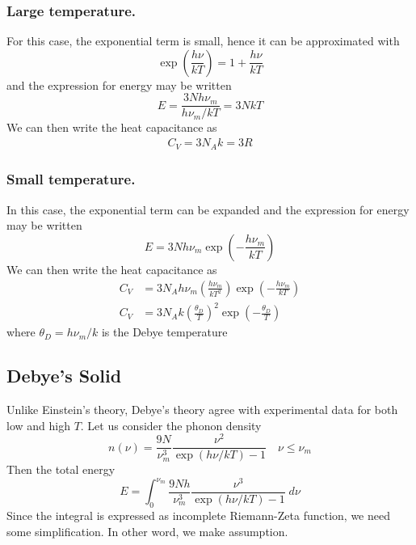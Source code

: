 \documentclass[../../../Main.tex]{subfiles}
\begin{document}
\subsubsection*{Large temperature.} For this case, the exponential term is small, hence it can be approximated with
\begin{equation*}
    \exp\left(\frac{h\nu}{kT}\right)=1+\frac{h\nu}{kT}
\end{equation*}
and the expression for energy may be written
\begin{equation*}
    E=\frac{3Nh\nu_m}{h\nu_m/kT}=3NkT
\end{equation*}
We can then write the heat capacitance as 
\begin{align*}
    C_V=3N_Ak=3R
\end{align*}

\subsubsection*{Small temperature.} In this case, the exponential term can be expanded and the expression for energy may be written
\begin{equation*}
    E=3Nh\nu_m\exp\left(-\frac{h\nu_m}{kT}\right)
\end{equation*}
We can then write the heat capacitance as 
\begin{align*}
    C_V&=3N_Ah\nu_m\left(\frac{h\nu_m}{kT^2}\right)\exp\left(-\frac{h\nu_m}{kT}\right)\\
    C_V&=3N_Ak \left(\frac{\theta_D}{T}\right)^2\exp\left(-\frac{\theta_D}{T}\right)
\end{align*}
where $\theta_D=h\nu_m/k$ is the Debye temperature

\subsection*{Debye's Solid}
Unlike Einstein's theory, Debye's theory agree with experimental data for both low and high $T$. Let us consider the phonon density
\begin{equation*}
    n(\nu)=\frac{9N}{\nu_m^3}\frac{\nu^2}{\exp(h\nu/kT)-1}\quad\nu\leq\nu_m
\end{equation*} 
Then the total energy
\begin{equation*}
    E=\int_{0}^{\nu_m}\frac{9Nh}{\nu_m^3}\frac{\nu^3}{\exp(h\nu/kT)-1}\;d\nu
\end{equation*}
Since the integral is expressed as incomplete Riemann-Zeta function, we need some simplification. In other word, we make assumption.
\end{document}
